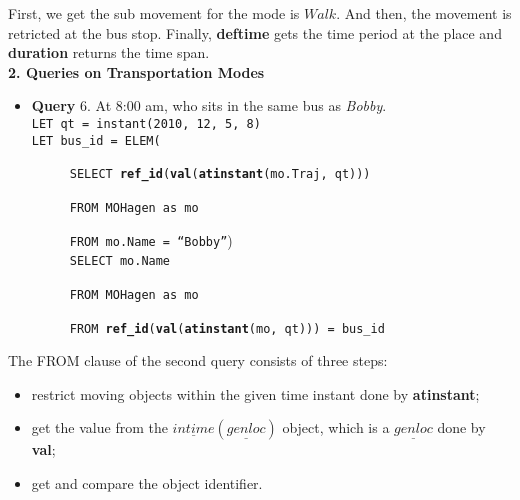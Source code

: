 First, we get the sub movement for the mode is $Walk$. And then, the movement is retricted at the bus stop. Finally, \textbf{deftime} gets the time period at the place and \textbf{duration} returns the time span. \\


\textbf{2. Queries on Transportation Modes} \\

\begin{itemize}
 \item \textbf{Query} 6. At 8:00 am, who sits in the same bus as \textit{Bobby}. \\

\texttt{LET qt = instant(2010, 12, 5, 8)}\\

\texttt{LET bus\_id = ELEM(} 

$\hspace{1cm}$ \texttt{SELECT \textbf{ref\_id}(\textbf{val}(\textbf{atinstant}(mo.Traj, qt)))}

$\hspace{1cm}$ \texttt{FROM MOHagen as mo}

$\hspace{1cm}$ \texttt{FROM mo.Name = ``Bobby''}) \\


$\hspace{1cm}$ \texttt{SELECT mo.Name}

$\hspace{1cm}$ \texttt{FROM MOHagen as mo}

$\hspace{1cm}$ \texttt{FROM \textbf{ref\_id}(\textbf{val}(\textbf{atinstant}(mo, qt))) = bus\_id} \\
\end{itemize}

The FROM clause of the second query consists of three steps: 

\begin{itemize}
 \item restrict moving objects within the given time instant done by \textbf{atinstant};
 \item get the value from the $\underline{intime}(\underline{genloc})$ object, which is a $\underline{genloc}$ done by \textbf{val};
 \item get and compare the object identifier.  \\
\end{itemize}



